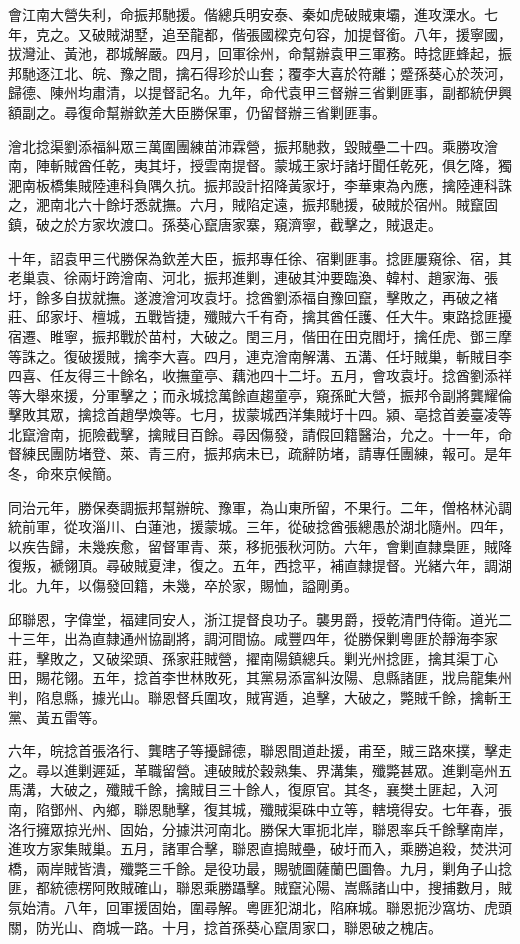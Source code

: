 \begin{pinyinscope}
會江南大營失利，命振邦馳援。偕總兵明安泰、秦如虎破賊東壩，進攻溧水。七年，克之。又破賊湖墅，追至龍都，偕張國樑克句容，加提督銜。八年，援寧國，拔灣沚、黃池，郡城解嚴。四月，回軍徐州，命幫辦袁甲三軍務。時捻匪蜂起，振邦馳逐江北、皖、豫之間，擒石得珍於山套；覆李大喜於符離；蹙孫葵心於茨河，歸德、陳州均肅清，以提督記名。九年，命代袁甲三督辦三省剿匪事，副都統伊興額副之。尋復命幫辦欽差大臣勝保軍，仍留督辦三省剿匪事。

澮北捻渠劉添福糾眾三萬圍團練苗沛霖營，振邦馳救，毀賊壘二十四。乘勝攻澮南，陣斬賊酋任乾，夷其圩，授雲南提督。蒙城王家圩諸圩聞任乾死，俱乞降，獨淝南板橋集賊陸連科負隅久抗。振邦設計招降黃家圩，李華東為內應，擒陸連科誅之，淝南北六十餘圩悉就撫。六月，賊陷定遠，振邦馳援，破賊於宿州。賊竄固鎮，破之於方家坎渡口。孫葵心竄唐家寨，窺濟寧，截擊之，賊退走。

十年，詔袁甲三代勝保為欽差大臣，振邦專任徐、宿剿匪事。捻匪屢窺徐、宿，其老巢袁、徐兩圩跨澮南、河北，振邦進剿，連破其沖要臨渙、韓村、趙家海、張圩，餘多自拔就撫。遂渡澮河攻袁圩。捻酋劉添福自豫回竄，擊敗之，再破之褚莊、邱家圩、檀城，五戰皆捷，殲賊六千有奇，擒其酋任護、任大牛。東路捻匪擾宿遷、睢寧，振邦戰於苗村，大破之。閏三月，偕田在田克閻圩，擒任虎、鄧三摩等誅之。復破援賊，擒李大喜。四月，連克澮南解溝、五溝、任圩賊巢，斬賊目李四喜、任友得三十餘名，收撫童亭、藕池四十二圩。五月，會攻袁圩。捻酋劉添祥等大舉來援，分軍擊之；而永城捻萬餘直趨童亭，窺孫甿大營，振邦令副將龔耀倫擊敗其眾，擒捻首趙學煥等。七月，拔蒙城西洋集賊圩十四。潁、亳捻首姜臺凌等北竄澮南，扼險截擊，擒賊目百餘。尋因傷發，請假回籍醫治，允之。十一年，命督練民團防堵登、萊、青三府，振邦病未已，疏辭防堵，請專任團練，報可。是年冬，命來京候簡。

同治元年，勝保奏調振邦幫辦皖、豫軍，為山東所留，不果行。二年，僧格林沁調統前軍，從攻淄川、白蓮池，援蒙城。三年，從破捻酋張總愚於湖北隨州。四年，以疾告歸，未幾疾愈，留督軍青、萊，移扼張秋河防。六年，會剿直隸梟匪，賊降復叛，褫翎頂。尋破賊夏津，復之。五年，西捻平，補直隸提督。光緒六年，調湖北。九年，以傷發回籍，未幾，卒於家，賜恤，謚剛勇。

邱聯恩，字偉堂，福建同安人，浙江提督良功子。襲男爵，授乾清門侍衛。道光二十三年，出為直隸通州協副將，調河間協。咸豐四年，從勝保剿粵匪於靜海李家莊，擊敗之，又破梁頭、孫家莊賊營，擢南陽鎮總兵。剿光州捻匪，擒其渠丁心田，賜花翎。五年，捻首李世林敗死，其黨易添富糾汝陽、息縣諸匪，戕烏龍集州判，陷息縣，據光山。聯恩督兵圍攻，賊宵遁，追擊，大破之，斃賊千餘，擒斬王黨、黃五雷等。

六年，皖捻首張洛行、龔瞎子等擾歸德，聯恩間道赴援，甫至，賊三路來撲，擊走之。尋以進剿遲延，革職留營。連破賊於穀熟集、界溝集，殲斃甚眾。進剿亳州五馬溝，大破之，殲賊千餘，擒賊目三十餘人，復原官。其冬，襄樊土匪起，入河南，陷鄧州、內鄉，聯恩馳擊，復其城，殲賊渠硃中立等，轄境得安。七年春，張洛行擁眾掠光州、固始，分據洪河南北。勝保大軍扼北岸，聯恩率兵千餘擊南岸，進攻方家集賊巢。五月，諸軍合擊，聯恩直搗賊壘，破圩而入，乘勝追殺，焚洪河橋，兩岸賊皆潰，殲斃三千餘。是役功最，賜號圖薩蘭巴圖魯。九月，剿角子山捻匪，都統德楞阿敗賊確山，聯恩乘勝躡擊。賊竄沁陽、嵩縣諸山中，搜捕數月，賊氛始清。八年，回軍援固始，圍尋解。粵匪犯湖北，陷麻城。聯恩扼沙窩坊、虎頭關，防光山、商城一路。十月，捻首孫葵心竄周家口，聯恩破之槐店。


\end{pinyinscope}
